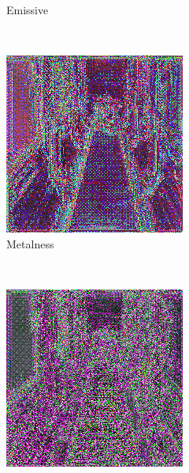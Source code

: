 \begin{figure}[h!]
\begin{subfigure}[b]{0.175\textwidth}
     \caption{Emissive}\label{subfig:1}
    \end{subfigure}
    ~
    \begin{subfigure}[b]{0.175\textwidth}
     \includegraphics[width=\textwidth]{figures/result/triple/depth_albedo_metalness/2.png}
     \caption{Metalness}
    \end{subfigure}
    ~
    \begin{subfigure}[b]{0.175\textwidth}
     \includegraphics[width=\textwidth]{figures/result/triple/depth_albedo_normal/2.png}

\end{subfigure}
\end{figure}
